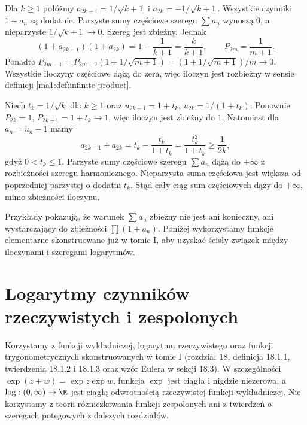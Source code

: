 \begin{przyklad}
\label{ma1:ex:series-converges-product-zero}
Dla $k\ge1$ połóżmy $a_{2k-1}=1/\sqrt{k+1}$ i $a_{2k}=-1/\sqrt{k+1}$. Wszystkie czynniki $1+a_n$ są dodatnie. Parzyste sumy częściowe szeregu $\sum a_n$ wynoszą $0$, a nieparzyste $1/\sqrt{k+1}\to0$. Szereg jest zbieżny. Jednak
\[
 (1+a_{2k-1})(1+a_{2k})=1-\frac1{k+1}
 =\frac{k}{k+1},
 \qquad P_{2m}=\frac1{m+1}.
\]
Ponadto $P_{2m-1}=P_{2m-2}(1+1/\sqrt{m+1})=(1+1/\sqrt{m+1})/m\to0$. Wszystkie iloczyny częściowe dążą do zera, więc iloczyn jest rozbieżny w sensie definicji \ref{ma1:def:infinite-product}.
\end{przyklad}

\begin{przyklad}
\label{ma1:ex:product-converges-series-diverges}
Niech $t_k=1/\sqrt{k}$ dla $k\ge1$ oraz $u_{2k-1}=1+t_k$, $u_{2k}=1/(1+t_k)$. Ponownie $P_{2k}=1$, $P_{2k-1}=1+t_k\to1$, więc iloczyn jest zbieżny do $1$. Natomiast dla $a_n=u_n-1$ mamy
\[
 a_{2k-1}+a_{2k}=t_k-\frac{t_k}{1+t_k}
 =\frac{t_k^2}{1+t_k}\ge\frac1{2k},
\]
gdyż $0<t_k\le1$. Parzyste sumy częściowe szeregu $\sum a_n$ dążą do $+\infty$ z rozbieżności szeregu harmonicznego. Nieparzysta suma częściowa jest większa od poprzedniej parzystej o dodatni $t_k$. Stąd cały ciąg sum częściowych dąży do $+\infty$, mimo zbieżności iloczynu.
\end{przyklad}

\begin{uwaga}
Przykłady pokazują, że warunek $\sum a_n$ zbieżny nie jest ani konieczny, ani wystarczający do zbieżności $\prod(1+a_n)$. Poniżej wykorzystamy funkcje elementarne skonstruowane już w tomie I, aby uzyskać ścisły związek między iloczynami i szeregami logarytmów.
\end{uwaga}


\section{Logarytmy czynników rzeczywistych i zespolonych}
Korzystamy z funkcji wykładniczej, logarytmu rzeczywistego
oraz funkcji trygonometrycznych skonstruowanych w tomie I
(rozdział 18, definicja 18.1.1, twierdzenia 18.1.2
i 18.1.3 oraz wzór Eulera w sekcji 18.3). W szczególności
$\exp(z+w)=\exp z\exp w$, funkcja $\exp$ jest ciągła
i nigdzie niezerowa, a $\log:(0,\infty)\to\R$ jest ciągłą
odwrotnością rzeczywistej funkcji wykładniczej.
Nie korzystamy z teorii różniczkowania funkcji zespolonych
ani z twierdzeń o szeregach potęgowych z dalszych rozdziałów.

